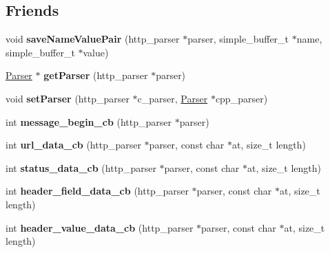 \subsection*{Friends}
\begin{DoxyCompactItemize}
\item 
\mbox{\label{class_parser_a9726af2e5828a3562c0fd11b5ac26c44}} 
void {\bfseries save\+Name\+Value\+Pair} (http\+\_\+parser $\ast$parser, simple\+\_\+buffer\+\_\+t $\ast$name, simple\+\_\+buffer\+\_\+t $\ast$value)
\item 
\mbox{\label{class_parser_af30ac5f51242b2b1799be52420bac286}} 
\hyperlink{class_parser}{Parser} $\ast$ {\bfseries get\+Parser} (http\+\_\+parser $\ast$parser)
\item 
\mbox{\label{class_parser_a553cdbecb83388bcb98eccddac9af8fa}} 
void {\bfseries set\+Parser} (http\+\_\+parser $\ast$c\+\_\+parser, \hyperlink{class_parser}{Parser} $\ast$cpp\+\_\+parser)
\item 
\mbox{\label{class_parser_a4d73dd1c39e6ea25e3d0ca7eca36b241}} 
int {\bfseries message\+\_\+begin\+\_\+cb} (http\+\_\+parser $\ast$parser)
\item 
\mbox{\label{class_parser_a30193b3f5c1dc5af2675d6d31e343e8a}} 
int {\bfseries url\+\_\+data\+\_\+cb} (http\+\_\+parser $\ast$parser, const char $\ast$at, size\+\_\+t length)
\item 
\mbox{\label{class_parser_a62661f27c58fe69011a1016bf29138ce}} 
int {\bfseries status\+\_\+data\+\_\+cb} (http\+\_\+parser $\ast$parser, const char $\ast$at, size\+\_\+t length)
\item 
\mbox{\label{class_parser_aaae17943dd3f7db938ec5a1f8c9c8d9b}} 
int {\bfseries header\+\_\+field\+\_\+data\+\_\+cb} (http\+\_\+parser $\ast$parser, const char $\ast$at, size\+\_\+t length)
\item 
\mbox{\label{class_parser_aa28d460926c10a8f055916842c8eef23}} 
int {\bfseries header\+\_\+value\+\_\+data\+\_\+cb} (http\+\_\+parser $\ast$parser, const char $\ast$at, size\+\_\+t length)
\item 
\mbox{\label{class_parser_afaf8bbeac4baa4f0d275635735f3ed8b}} 

\end{DoxyCompactItemize}
